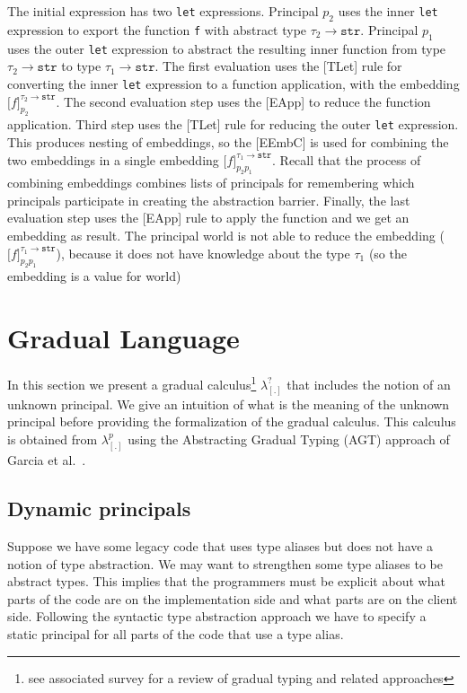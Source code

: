\documentclass{article}
\newcommand{\emb}[3]{\texttt{[}#1\texttt{]}_{#2}^{#3}}
\newcommand\icode[1]{\texttt{#1}}
\newcommand\irname[1]{[#1]}
\newcommand\newcalculus[0]{$\lambda^p_{\left[.\right]}$}
\newcommand\gcalculus[0]{$\lambda^?_{\left[.\right]}$}
\begin{document}
The initial expression has two \icode{let} expressions. Principal $p_2$ uses the inner \icode{let} expression to export the function \icode{f} with abstract type $\tau_2 \rightarrow \icode{str}$. Principal $p_1$ uses the outer \icode{let} expression to abstract the resulting inner function from type $\tau_2 \rightarrow \icode{str}$ to type $\tau_1 \rightarrow \icode{str}$. The first evaluation uses the \irname{TLet} rule for converting the inner \icode{let} expression to a function application, with the embedding $\emb{f}{p_2}{\tau_2 \rightarrow \texttt{str}}$. The second evaluation step uses the \irname{EApp} to reduce the function application. Third step uses the \irname{TLet} rule for reducing the outer \icode{let} expression. This produces nesting of embeddings, so the \irname{EEmbC} is used for combining the two embeddings in a single embedding $\emb{f}{p_2 p_1}{\tau_1 \rightarrow \texttt{str}}$. Recall that the process of combining embeddings combines lists of principals for remembering which principals participate in creating the abstraction barrier. Finally, the last evaluation step uses the \irname{EApp} rule to apply the function and we get an embedding as result. The principal {\sf world} is not able to reduce the embedding ($\emb{f}{p_2 p_1}{\tau_1 \rightarrow \icode{str}}$), because it does not have knowledge about the type $\tau_1$ (so the embedding is a value for {\sf world})

\section{Gradual Language}\label{sec:gradual_language}
In this section we present a gradual calculus\footnote{see associated survey for a review of gradual typing and related approaches} \gcalculus{} that includes the notion of an unknown principal. We give an intuition of what is the meaning of the unknown principal before providing the formalization of the gradual calculus. This calculus is obtained from \newcalculus{} using the Abstracting Gradual Typing (AGT) approach of Garcia et al.~\cite{garciaAl:popl2016}. 

\subsection{Dynamic principals}
Suppose we have some legacy code that uses type aliases but does not have a notion of type abstraction. We may want to strengthen some type aliases to be abstract types. This implies that the programmers must be explicit about what parts of the code are on the implementation side and what parts are on the client side. Following the syntactic type abstraction approach we have to specify a static principal for all parts of the code that use a type alias. 
\end{document}
